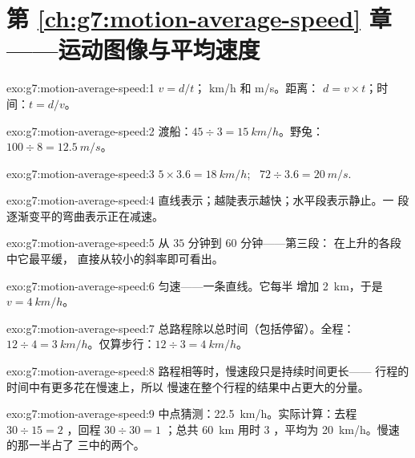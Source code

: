 \section*{第 \ref{ch:g7:motion-average-speed} 章——运动图像与平均速度}

\begin{solution}{exo:g7:motion-average-speed:1}
$v = d/t$； \unit{km/h} 和 \unit{m/s}。距离：
$d = v \times t$；时间：$t = d/v$。
\end{solution}

\begin{solution}{exo:g7:motion-average-speed:2}
渡船：$45 \div 3 = \qty{15}{km/h}$。野兔：$100 \div 8 =
\qty{12.5}{m/s}$。
\end{solution}

\begin{solution}{exo:g7:motion-average-speed:3}
$5 \times 3.6 = \qty{18}{km/h}$; \ $72 \div 3.6 = \qty{20}{m/s}$.
\end{solution}

\begin{solution}{exo:g7:motion-average-speed:4}
直线表示；越陡表示越快；水平段表示静止。一
段逐渐变平的弯曲表示正在减速。
\end{solution}

\begin{solution}{exo:g7:motion-average-speed:5}
从 $35$ 分钟到 $60$ 分钟——第三段：
在上升的各段中它最平缓，
直接从较小的斜率即可看出。
\end{solution}

\begin{solution}{exo:g7:motion-average-speed:6}
匀速——一条直线。它每半
增加 \qty{2}{km}，于是 $v = \qty{4}{km/h}$。
\end{solution}

\begin{solution}{exo:g7:motion-average-speed:7}
总路程除以总时间（包括停留）。全程：
$12 \div 4 = \qty{3}{km/h}$。仅算步行：$12 \div 3 =
\qty{4}{km/h}$。
\end{solution}

\begin{solution}{exo:g7:motion-average-speed:8}
路程相等时，慢速段只是持续时间更长——
行程的时间中有更多花在慢速上，所以
慢速在整个行程的结果中占更大的分量。
\end{solution}

\begin{solution}{exo:g7:motion-average-speed:9}
中点猜测：\qty{22.5}{km/h}。实际计算：去程 $30 \div 15 = 2$
，回程 $30 \div 30 = 1$ ；总共 \qty{60}{km} 用时 $3$
，平均为 \qty{20}{km/h}。慢速的那一半占了
三中的两个。
\end{solution}

